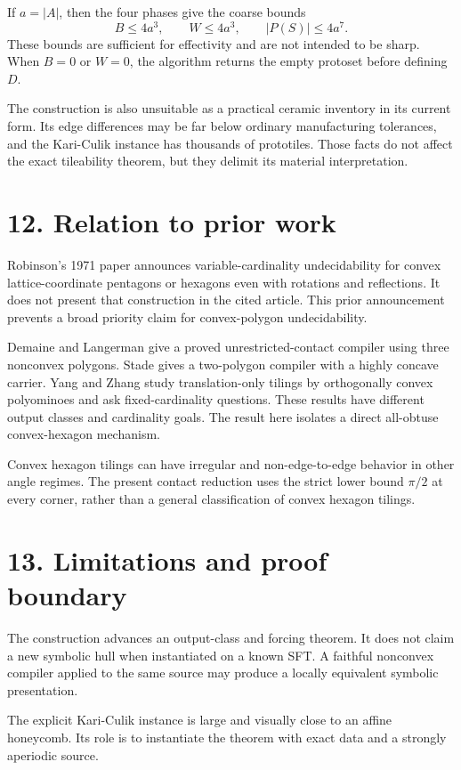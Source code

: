 \documentclass[11pt]{article}
\begin{document}
If \(a=|A|\), then the four phases give the coarse bounds
\[
  B\leq4a^3,\qquad W\leq4a^3,\qquad |P(S)|\leq4a^7.
\]
These bounds are sufficient for effectivity and are not intended to be
sharp. When \(B=0\) or \(W=0\), the algorithm returns the empty protoset
before defining \(D\).

The construction is also unsuitable as a practical ceramic inventory in its
current form. Its edge differences may be far below ordinary manufacturing
tolerances, and the Kari-Culik instance has thousands of prototiles. Those
facts do not affect the exact tileability theorem, but they delimit its
material interpretation.

\section*{12. Relation to prior work}

Robinson's 1971 paper announces variable-cardinality undecidability for
convex lattice-coordinate pentagons or hexagons even with rotations and
reflections. It does not present that construction in the cited article.
This prior announcement prevents a broad priority claim for convex-polygon
undecidability.

Demaine and Langerman give a proved unrestricted-contact compiler using
three nonconvex polygons. Stade gives a two-polygon compiler with a highly
concave carrier. Yang and Zhang study translation-only tilings by
orthogonally convex polyominoes and ask fixed-cardinality questions. These
results have different output classes and cardinality goals. The result here
isolates a direct all-obtuse convex-hexagon mechanism.

Convex hexagon tilings can have irregular and non-edge-to-edge behavior in
other angle regimes. The present contact reduction uses the strict lower
bound \(\pi/2\) at every corner, rather than a general classification of
convex hexagon tilings.

\section*{13. Limitations and proof boundary}

The construction advances an output-class and forcing theorem. It does not
claim a new symbolic hull when instantiated on a known SFT. A faithful
nonconvex compiler applied to the same source may produce a locally
equivalent symbolic presentation.

The explicit Kari-Culik instance is large and visually close to an affine
honeycomb. Its role is to instantiate the theorem with exact data and a
strongly aperiodic source.
\end{document}
